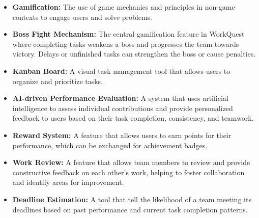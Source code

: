 \begin{itemize}  
    \item \textbf{Gamification:} The use of game mechanics and principles in non-game contexts to engage users and solve problems.  
    \item \textbf{Boss Fight Mechanism:} The central gamification feature in WorkQuest where completing tasks weakens a boss and progresses the team towards victory. Delays or unfinished tasks can strengthen the boss or cause penalties.  
    \item \textbf{Kanban Board:} A visual task management tool that allows users to organize and prioritize tasks.
    \item \textbf{AI-driven Performance Evaluation:} A system that uses artificial intelligence to assess individual contributions and provide personalized feedback to users based on their task completion, consistency, and teamwork.  
    \item \textbf{Reward System:} A feature that allows users to earn points for their performance, which can be exchanged for achievement badges.
    \item \textbf{Work Review:} A feature that allows team members to review and provide constructive feedback on each other’s work, helping to foster collaboration and identify areas for improvement.  
    \item \textbf{Deadline Estimation:} A tool that tell the likelihood of a team meeting its deadlines based on past performance and current task completion patterns.  
\end{itemize}  
